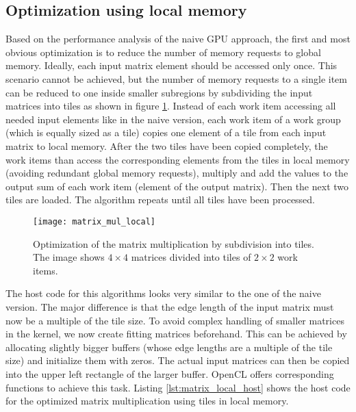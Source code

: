 \subsection{Optimization using local memory}
\label{sec:matrix_mul_local}
Based on the performance analysis of the naive GPU approach, the first and most obvious optimization is to reduce the number of memory requests to global memory. Ideally, each input matrix element should be accessed only once. This scenario cannot be achieved, but the number of memory requests to a single item can be reduced to one inside smaller subregions by subdividing the input matrices into tiles as shown in figure \ref{fig:matrix_mul_local}. Instead of each work item accessing all needed input elements like in the naive version, each work item of a work group (which is equally sized as a tile) copies one element of a tile from each input matrix to local memory. After the two tiles have been copied completely, the work items than access the corresponding elements from the tiles in local memory (avoiding redundant global memory requests), multiply and add the values to the output sum of each work item (element of the output matrix). Then the next two tiles are loaded. The algorithm repeats until all tiles have been processed.

\begin{figure}
\centering
\texttt{[image: matrix\_mul\_local]}
\caption{Optimization of the matrix multiplication by subdivision into tiles. The image shows $4 \times 4$ matrices divided into tiles of $2 \times 2$ work items.}
\label{fig:matrix_mul_local}
\end{figure}

The host code for this algorithms looks very similar to the one of the naive version. The major difference is that the edge length of the input matrix must now be a multiple of the tile size. To avoid complex handling of smaller matrices in the kernel, we now create fitting matrices beforehand. This can be achieved by allocating slightly bigger buffers (whose edge lengths are a multiple of the tile size) and initialize them with zeros. The actual input matrices can then be copied into the upper left rectangle of the larger buffer. OpenCL offers corresponding functions to achieve this task. Listing \ref{lst:matrix_local_host} shows the host code for the optimized matrix multiplication using tiles in local memory.



